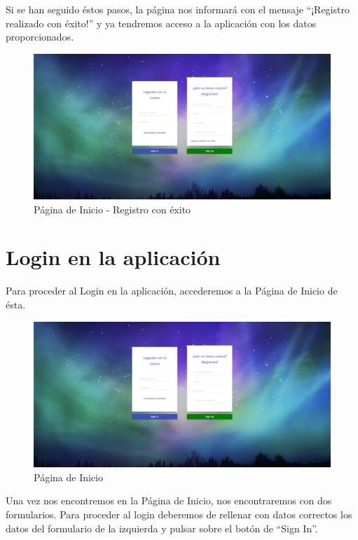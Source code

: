 \documentclass[11pt,openany]{book}
\begin{document}
Si se han seguido éstos pasos, la página nos informará con el mensaje ``¡Registro realizado con éxito!'' y ya tendremos acceso a la aplicación con los datos proporcionados.

\begin{figure}[H]
\centering
\includegraphics[totalheight=6cm]{manualUsuario/registroConExito.png}
\caption{Página de Inicio - Registro con éxito}
\end{figure}

\section{Login en la aplicación}

Para proceder al Login en la aplicación, accederemos a la Página de Inicio de ésta.

\begin{figure}[H]
\centering
\includegraphics[totalheight=6cm]{manualUsuario/paginaInicio.png}
\caption{Página de Inicio}
\end{figure}

Una vez nos encontremos en la Página de Inicio, nos encontraremos con dos formularios. Para proceder al login deberemos de rellenar con datos correctos los datos del formulario de la izquierda y pulsar sobre el botón de ``Sign In''.
\end{document}
